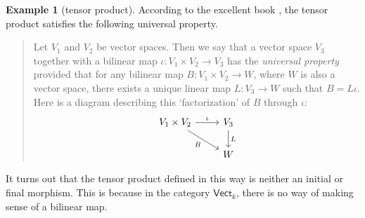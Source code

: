 \documentclass[a4paper]{report}
\theoremstyle{definition}
\newtheorem{example}{Example}[section]
\theoremstyle{plain}
\theoremstyle{remark}
\begin{document}
\begin{example}[tensor product]
  \label{eg:universalpropertyoftensorproduct}
  According to the excellent book \cite{sontz-principal-bundles-classical}, the tensor product satisfies the following universal property.
  \begin{quote}
    Let $V_{1}$ and $V_{2}$ be vector spaces. Then we say that a vector space $V_{3}$ together with a bilinear map $\iota\colon V_{1} \times V_{2} \to V_{3}$ has the \emph{universal property} provided that for any bilinear map $B\colon V_{1} \times V_{2} \to W$, where $W$ is also a vector space, there exists a unique linear map $L\colon V_{3} \to W$ such that $B = L\iota$. Here is a diagram describing this `factorization' of $B$ through $\iota$:
    \begin{equation*}
      \begin{tikzcd}
        V_{1} \times V_{2} \arrow[r, "\iota"] \arrow[rd, swap, "B"] & V_{3} \arrow[d, "L"] \\
        & W
      \end{tikzcd}
    \end{equation*}
  \end{quote}

  It turns out that the tensor product defined in this way is neither an initial or final morphism. This is because in the category $\mathsf{Vect}_{k}$, there is no way of making sense of a bilinear map. 
\end{example}
\end{document}
